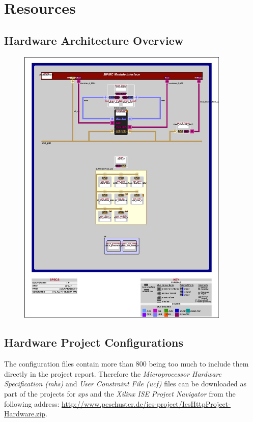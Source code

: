 \appendix 

\chapter{Resources}

\section{Hardware Architecture Overview}
\label{sec:hw_arch}

\begin{figure}[H]
\centering
\includegraphics[width=0.9\textwidth]{system_blkd.jpg}
\end{figure}


\section{Hardware Project Configurations}

The configuration files contain more than 800 being too much to include them directly in the project report. Therefore the \textit{Microprocessor Hardware Specification (mhs)} and \textit{User Constraint File (ucf)} files can be downloaded as part of the projects for \textit{\gls{xps}} and the \textit{Xilinx ISE Project Navigator} from the following address: \url{http://www.peschuster.de/ies-project/IesHttpProject-Hardware.zip}.
\\

